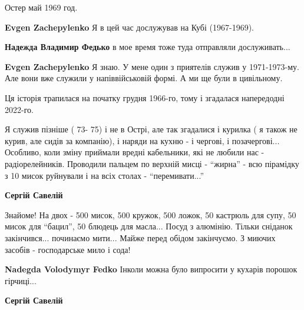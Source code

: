  
 
 
 
 
\zzSecCmt

\begin{itemize} %
Остер май 1969 год.

\begin{itemize} %
\textbf{Evgen Zachepylenko} Я в цей час дослужував на Кубі (1967-1969).

\textbf{Надежда Владимир Федько} в мое время тоже туда отправляли дослуживать...

\textbf{Evgen Zachepylenko} Я знаю. У мене один з приятелів служив у 1971-1973-му. Але вони вже служили у напіввійськовій формі. А ми ще були в цивільному.
\end{itemize} %


Ця історія трапилася на початку грудня 1966-го, тому і згадалася напередодні 2022-го.


Я служив пізніше ( 73- 75) і не в Острі, але так згадалися і курилка ( я також
не курив, але сидів за компанію), і наряди на кухню - і чергові, і
позачергові... Особливо, коли зміну приймали вредні кабельники, які не любили
нас - радіорелейників. Проводили пальцем по верхній мисці - \enquote{жирна} - всю
пірамідку з 10 мисок руйнували і на всіх столах - \enquote{перемивати...}

\begin{itemize} %
\textbf{Сергій Савелій} 

Знайоме! На двох - 500 мисок, 500 кружок, 500 ложок, 50 кастрюль для супу, 50
мисок для \enquote{бацил}, 50 блюдець для масла... Посуд з алюмінію. Тільки сніданок
закінчився... починаємо мити... Майже перед обідом закінчуємо. З миючих засобів
- господарське мило і сода!

\textbf{Nadegda Volodymyr Fedko} Інколи можна було випросити у кухарів порошок гірчиці...

\textbf{Сергій Савелій} 


\end{itemize}
\end{itemize}
